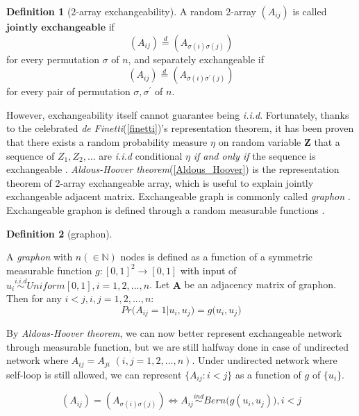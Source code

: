 \documentclass[12pt]{article}
\theoremstyle{definition}
\newtheorem{definition}{Definition}[section]
\begin{document}
	\begin{definition}[2-array exchangeability]
		\label{exchangeability}
		A random 2-array $(A_{ij})$ is called $\mathbf{\mbox{jointly exchangeable}}$ if 
		$$(A_{ij}) \stackrel{d}{=} (A_{\sigma(i) \sigma(j)})$$
		for every permutation $\sigma$ of $n$,
		and separately exchangeable if 
		$$(A_{ij}) \stackrel{d}{=} (A_{\sigma(i) \sigma^{\prime}(j) })$$
		for every pair of permutation $\sigma, \sigma^{\prime}$ of $n$.
	\end{definition}
	
However, exchangeability itself cannot guarantee being \textit{i.i.d}. Fortunately, thanks to the celebrated  \textit{de Finetti}(\ref{finetti})'s representation theorem, it has been proven that there exists a random probability measure $\eta$ on random variable $\mathbf{Z}$ that a sequence of $Z_{1}, Z_{2}, \ldots $ are \textit{i.i.d} conditional $\eta$ \textit{if and only if} the sequence is exchangeable \citep{orbanz2015bayesian, caron2014sparse}. \textit{Aldous-Hoover theorem}(\ref{Aldous_Hoover}) is the representation theorem of 2-array exchangeable array, which is useful to explain jointly exchangeable adjacent matrix. Exchangeable graph is commonly called \textit{graphon} \citep{lovasz2006limits}. Exchangeable graphon is defined through a random measurable functions \citep{chan2013estimation}.
	
\begin{definition}[graphon]
		\label{graphon}
		
		A \textit{graphon} with $n (\in \mathbb{N})$ nodes is defined as a function of a symmetric measurable function $g : [0,1]^2 \rightarrow [0,1]$ with input of $u_{i} \overset{i.i.d}{\sim} Uniform[0,1], i = 1,2,... ,n$. 
		Let $\mathbf{A}$ be an adjacency matrix of graphon. Then for any $i < j, i,j=1,2,...,n$:	
\begin{equation}
	Pr \big(   A_{ij} = 1 \big| u_{i}, u_{j} \big) = g \big(  u_{i}, u_{j} \big)
\end{equation}
\end{definition}
By \textit{Aldous-Hoover theorem}, we can now better represent exchangeable network through measurable function, but we are still halfway done in case of undirected network where $A_{ij} = A_{ji}$  $(i,j=1,2,... , n)$.  Under undirected network where self-loop is still allowed, we can represent $\{ A_{ij} : i < j \}$ as a function of $g$ of $\{ u_{i}\}$. 
	
\begin{equation}
( A_{ij} )  =  (   A_{\sigma(i) \sigma(j)}  ) \Longleftrightarrow A_{ij} \overset{ind}{\sim} Bern\big(  g(u_{i}, u_{j}) \big), i < j
\end{equation}  
	
\end{document}

